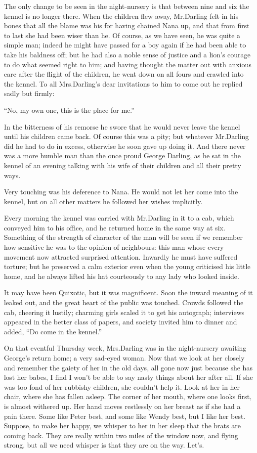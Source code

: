 The only change to be seen in the night-nursery is that
between nine and six the kennel is no longer there.
When the children flew away,
Mr.\@ Darling felt in his bones that all the blame was his for having chained Nana up,
and that from first to last she had been wiser than he.
Of course, as we have seen, he was quite a simple man;
indeed he might have passed for a boy again if he had been able to take his baldness off;
but he had also a noble sense of justice and a lion’s courage to do what seemed right to him;
and having thought the matter out with anxious care after the flight of the children,
he went down on all fours and crawled into the kennel.
To all Mrs.\@ Darling’s dear invitations to him to come out he replied sadly but firmly:

“No, my own one, this is the place for me.”

In the bitterness of his remorse he swore that he would never leave the kennel until his children came back.
Of course this was a pity;
but whatever Mr.\@ Darling did he had to do in excess,
otherwise he soon gave up doing it.
And there never was a more humble man than the once proud George Darling,
as he sat in the kennel of an evening talking with his wife of their children and all their pretty ways.

Very touching was his deference to Nana.
He would not let her come into the kennel,
but on all other matters he followed her wishes implicitly.

Every morning the kennel was carried with Mr.\@ Darling in it to a cab,
which conveyed him to his office, and he returned home in the same way at six.
Something of the strength of character of the man will be seen
if we remember how sensitive he was to the opinion of neighbours:
this man whose every movement now attracted surprised attention.
Inwardly he must have suffered torture;
but he preserved a calm exterior even when the young criticised his little home,
and he always lifted his hat courteously to any lady who looked inside.

It may have been Quixotic, but it was magnificent.
Soon the inward meaning of it leaked out,
and the great heart of the public was touched.
Crowds followed the cab, cheering it lustily;
charming girls scaled it to get his autograph;
interviews appeared in the better class of papers,
and society invited him to dinner and added, “Do come in the kennel.”

On that eventful Thursday week,
Mrs.\@ Darling was in the night-nursery awaiting George’s return home;
a very sad-eyed woman.
Now that we look at her closely and remember the gaiety of her in the old days,
all gone now just because she has lost her babes,
I find I won’t be able to say nasty things about her after all.
If she was too fond of her rubbishy children, she couldn’t help it.
Look at her in her chair, where she has fallen asleep.
The corner of her mouth, where one looks first, is almost withered up.
Her hand moves restlessly on her breast as if she had a pain there.
Some like Peter best, and some like Wendy best, but I like her best.
Suppose, to make her happy, we whisper to her in her sleep that the brats are coming back.
They are really within two miles of the window now, and flying strong,
but all we need whisper is that they are on the way.
Let’s.


